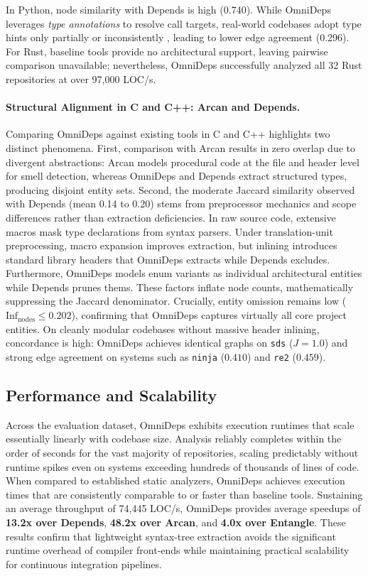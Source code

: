 \documentclass[a4paper, 11pt]{article}
\begin{document}
In Python, node similarity with Depends is high (0.740). While OmniDeps
leverages \textit{type annotations} to resolve call targets,
real-world codebases adopt type hints only partially
or inconsistently \cite{magalhaes_understanding_2026}, leading to
lower edge agreement (0.296). For Rust, baseline tools provide no
architectural support, leaving
pairwise comparison unavailable; nevertheless, OmniDeps successfully
analyzed all 32 Rust repositories at over 97,000
LOC/s.

\paragraph{Structural Alignment in C and C++: Arcan and Depends.}
Comparing OmniDeps against existing tools in C and C++ highlights two distinct
phenomena. First, comparison with Arcan results in zero overlap due to
divergent abstractions: Arcan models procedural code at the file and
header level for smell detection, whereas OmniDeps and Depends
extract structured types, producing disjoint entity sets.
Second, the moderate Jaccard similarity observed with Depends
(mean 0.14 to 0.20) stems from preprocessor mechanics and scope differences
rather than extraction deficiencies. In raw source code, extensive macros mask
type declarations from syntax parsers. Under translation-unit preprocessing,
macro expansion improves extraction, but inlining introduces standard library
headers that OmniDeps extracts while Depends excludes. Furthermore, OmniDeps
models enum variants as individual architectural entities while Depends prunes
thems. These factors inflate node counts, mathematically
suppressing the Jaccard denominator. Crucially, entity omission remains low
($\text{Inf}_{\text{nodes}} \le 0.202$), confirming that OmniDeps captures
virtually all core project entities. On cleanly modular codebases without
massive header inlining, concordance is high: OmniDeps achieves identical graphs
on \texttt{sds} ($J = 1.0$) and strong edge agreement on systems such as
\texttt{ninja} ($0.410$) and \texttt{re2} ($0.459$).

\subsection{Performance and Scalability}
Across the evaluation dataset, OmniDeps exhibits execution runtimes
that scale essentially linearly with codebase size. Analysis reliably
completes within the order of seconds for the vast majority of
repositories, scaling predictably without runtime spikes even on
systems exceeding hundreds of thousands of lines of code.
When compared to established static analyzers, OmniDeps achieves
execution times that are consistently comparable to or faster than
baseline tools. Sustaining an average throughput of 74,445 LOC/s, OmniDeps
provides average speedups of \textbf{13.2x over Depends}, \textbf{48.2x over
Arcan}, and \textbf{4.0x over Entangle}.
These results confirm that lightweight syntax-tree extraction avoids
the significant runtime overhead of compiler front-ends while
maintaining practical scalability for continuous integration pipelines.
\end{document}
